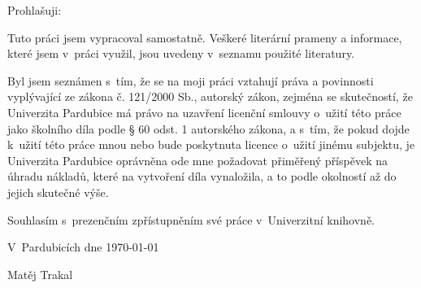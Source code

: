 
\noindent Prohlašuji:
\vspace{12pt}

Tuto práci jsem vypracoval samostatně. Veškeré literární prameny a informace, které jsem v~práci využil, jsou uvedeny v~seznamu použité literatury.
\vspace{12pt}

Byl jsem seznámen s~tím, že se na moji práci vztahují práva a povinnosti vyplývající ze zákona č. 121/2000 Sb., autorský zákon, zejména se skutečností, že Univerzita Pardubice má právo na uzavření licenční smlouvy o~užití této práce jako školního díla podle § 60 odst. 1 autorského zákona, a s~tím, že pokud dojde k~užití této práce mnou nebo bude poskytnuta licence o~užití jinému subjektu, je Univerzita Pardubice oprávněna ode mne požadovat přiměřený příspěvek na úhradu nákladů, které na vytvoření díla vynaložila, a to podle okolností až do jejich skutečné výše.
\vspace{12pt}

Souhlasím s~prezenčním zpřístupněním své práce v~Univerzitní knihovně.
\vspace{12pt}

V~Pardubicích dne \today

\vspace{24pt}
\begin{flushright}
Matěj Trakal
\end{flushright}

\normalsize
\newpage